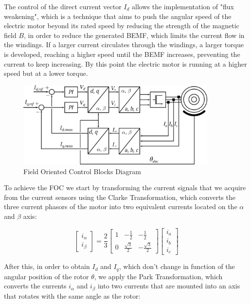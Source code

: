 The control of the direct current vector $I_{d}$ allows the implementation of "flux weakening", which is a technique that aims to push the angular speed of the electric motor beyond its rated speed by reducing the strength of the magnetic field $B$, in order to reduce the generated \ac{BEMF}, which limits the current flow in the windings. If a larger current circulates through the windings, a larger torque is developed, reaching a higher speed until the \ac{BEMF} increases, preventing the current to keep increasing. By this point the electric motor is running at a higher speed but at a lower torque.

\begin{figure}[htbp]
\centering
\includegraphics[width=10cm]{Images/foc_current.png} 
\caption[Field Oriented Control Blocks Diagram]{Field Oriented Control Blocks Diagram}
\label{fig:foc_current}
\end{figure}

To achieve the \ac{FOC} we start by transforming the current signals that we acquire from the current sensors using the Clarke Transformation, which converts the three current phasors of the motor into two equivalent currents located on the $\alpha$ and $\beta$ axis:

\[
\begin{bmatrix}
i_{\alpha}\\ 
i_{\beta}
\end{bmatrix}
=
\frac{2}{3}
\begin{bmatrix}
1 & -\frac{1}{2} & -\frac{1}{2}\\ 
0 & \frac{\sqrt{3}}{2} & -\frac{\sqrt{3}}{2}
\end{bmatrix}
\begin{bmatrix}
i_{a}\\
i_{b}\\
i_{c}
\end{bmatrix}
\]

After this, in order to obtain $I_{d}$ and $I_{q}$, which don't change in function of the angular position of the rotor $\theta$, we apply the Park Transformation, which converts the currents $i_{\alpha}$ and $i_{\beta}$ into two currents that are mounted into an axis that rotates with the same angle as the rotor:

